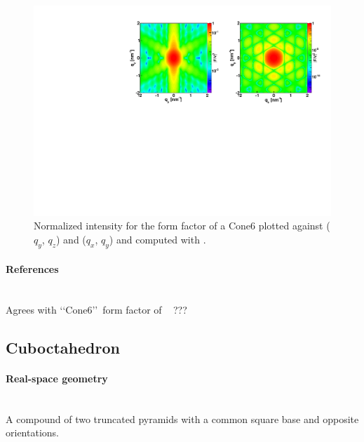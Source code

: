 \begin{figure}[h]
\begin{center}
\includegraphics[angle=-90,width=\textwidth]{fig/ff/figffcone6.pdf}
\end{center}
\caption{Normalized intensity for the form factor of a Cone6 plotted against ($q_y$, $q_z$) and ($q_x$, $q_y$) and computed with .}
\label{fig:FFCone6Ex}
\end{figure}

\paragraph{References}\strut\\
Agrees with \lq\lq Cone6\rq\rq\ form factor of \IsGISAXS~\cite{Laz02} ???

\clearpage
\subsection{Cuboctahedron} \label{sec:Cuboctahedron}

\paragraph{Real-space geometry}\strut\\
A compound of two truncated pyramids with a common square base
and opposite orientations.

